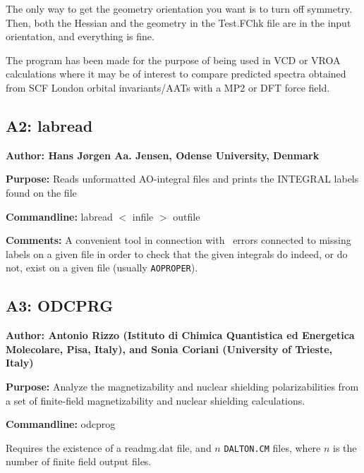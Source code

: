 The only way to get the geometry orientation you want is to turn
        off symmetry.
        Then, both the Hessian and the geometry in the Test.FChk file are
        in the input orientation, and everything is fine.

The program has been made for the purpose of being used in VCD or
VROA
calculations where it may be of interest to compare predicted spectra
obtained from SCF London orbital invariants/AATs with a MP2 or DFT force field.

\subsection*{A2: labread}

\noindent
{\large\bf Author: \normalsize\large Hans J\o rgen Aa. Jensen,
Odense University, Denmark}

\smallskip

\noindent
{\bf Purpose:} Reads unformatted AO-integral files and prints the
INTEGRAL labels found on the file

\smallskip
\noindent
{\bf Commandline:} labread $<$ infile $>$ outfile

\smallskip
\noindent
{\bf Comments:}  A convenient tool in connection with \dalton\ errors
connected to missing labels on a given file in order to check that the
given integrals do indeed, or do not, exist on a given file (usually
\verb|AOPROPER|).

\subsection*{A3: ODCPRG}

\noindent
{\large\bf Author: \normalsize\large Antonio Rizzo (Istituto di
Chimica Quantistica ed Energetica Molecolare, Pisa, Italy), and
Sonia Coriani (University of Trieste, Italy)}

\smallskip

\noindent
{\bf Purpose:} Analyze the magnetizability and nuclear shielding
polarizabilities from a set of finite-field magnetizability and
nuclear shielding calculations.

\smallskip
\noindent
{\bf Commandline:} odcprog

Requires the existence of a readmg.dat file, and $n$ \verb|DALTON.CM| files,
where $n$ is the number of finite field output files.

